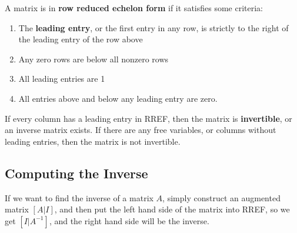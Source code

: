 \documentclass{article}
\begin{document}
\begin{definition}
A matrix is in \textbf{row reduced echelon form} if it satisfies some criteria:

\begin{enumerate}
    \item The \textbf{leading entry}, or the first entry in any row, is strictly to the right of the leading entry of the row above
    \item Any zero rows are below all nonzero rows
    \item All leading entries are 1
    \item All entries above and below any leading entry are zero.  
\end{enumerate}

If every column has a leading entry in RREF, then the matrix is \textbf{invertible}, or an inverse matrix exists. If there are any free variables, or columns without leading entries, then the matrix is not invertible.  
\end{definition}

\subsection{Computing the Inverse}

If we want to find the inverse of a matrix $A$, simply construct an augmented matrix $[A\vert I]$, and then put the left hand side of the matrix into RREF, so we get $[I\vert A^{-1}]$, and the right hand side will be the inverse.
\end{document}
